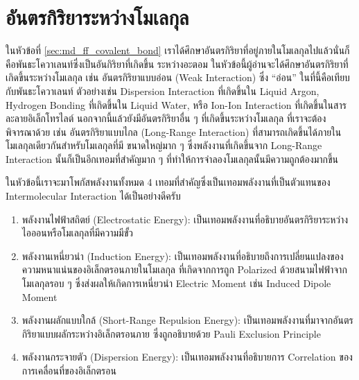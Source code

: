 \section{อันตรกิริยาระหว่างโมเลกุล}

ในหัวข้อที่ \ref{sec:md_ff_covalent_bond} เราได้ศึกษาอันตรกิริยาที่อยู่ภายในโมเลกุลไปแล้วนั่นก็คือพันธะโควาเลนท์ซึ่งเป็นอันกิริยาที่เกิดขึ้น%
ระหว่างอะตอม ในหัวข้อนี้ผู้อ่านจะได้ศึกษาอันตรกิริยาที่เกิดขึ้นระหว่างโมเลกุล เช่น อันตรกิริยาแบบอ่อน (Weak Interaction) ซึ่ง \enquote{อ่อน}
ในที่นี้คือเทียบกับพันธะโควาเลนท์ ตัวอย่างเช่น Dispersion Interaction ที่เกิดขึ้นใน Liquid Argon, Hydrogen Bonding ที่เกิดขึ้นใน
Liquid Water, หรือ Ion-Ion Interaction ที่เกิดขึ้นในสารละลายอิเล็กโทรไลต์ นอกจากนี้แล้วยังมีอันตรกิริยาอื่น ๆ ที่เกิดขึ้นระหว่างโมเลกุล%
ที่เราจะต้องพิจารณาด้วย เช่น อันตรกิริยาแบบไกล (Long-Range Interaction) ที่สามารถเกิดขึ้นได้ภายในโมเลกุลเดียวกันสำหรับโมเลกุลที่มี%
ขนาดใหญ่มาก ๆ ซึ่งพลังงานที่เกิดขึ้นจาก Long-Range Interaction นั้นก็เป็นอีกเทอมที่สำคัญมาก ๆ ที่ทำให้การจำลองโมเลกุลนั้นมีความถูกต้องมากขึ้น

ในหัวข้อนี้เราจะมาโพกัสพลังงานทั้งหมด 4 เทอมที่สำคัญซึ่งเป็นเทอมพลังงานที่เป็นตัวแทนของ Intermolecular Interaction ได้เป็นอย่างดีครับ

\begin{enumerate}[topsep=0pt,noitemsep]
    \setlength\itemsep{1em}
    \item พลังงานไฟฟ้าสถิตย์ (Electrostatic Energy): เป็นเทอมพลังงานที่อธิบายอันตรกิริยาระหว่างไอออนหรือโมเลกุลที่มีความมีขั้ว

    \item พลังงานเหนี่ยวนำ (Induction Energy): เป็นเทอมพลังงานที่อธิบายถึงการเปลี่ยนแปลงของความหนาแน่นของอิเล็กตรอนภายในโมเลกุล%
          ที่เกิดจากการถูก Polarized ด้วยสนามไฟฟ้าจากโมเลกุลรอบ ๆ ซึ่งส่งผลให้เกิดการเหนี่ยวนำ Electric Moment เช่น Induced Dipole
          Moment

    \item พลังงานผลักแบบใกล้ (Short-Range Repulsion Energy): เป็นเทอมพลังงานที่มาจากอันตรกิริยาแบบผลักระหว่างอิเล็กตรอนภาย%
          ซึ่งถูกอธิบายด้วย Pauli Exclusion Principle

    \item พลังงานกระจายตัว (Dispersion Energy): เป็นเทอมพลังงานที่อธิบายการ Correlation ของการเคลื่อนที่ของอิเล็กตรอน
\end{enumerate}

